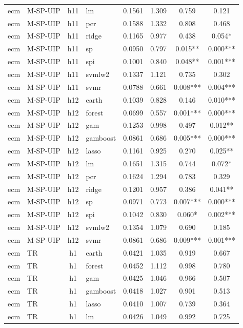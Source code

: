 \begin{ThreePartTable}
\begin{longtable}[t]{llclcccc}
ecm & M-SP-UIP & h11 & lm & 0.1561 & 1.309 & 0.759 & 0.121\\
ecm & M-SP-UIP & h11 & pcr & 0.1588 & 1.332 & 0.808 & 0.468\\
ecm & M-SP-UIP & h11 & ridge & 0.1165 & 0.977 & 0.438 & 0.054*\\
ecm & M-SP-UIP & h11 & sp & 0.0950 & 0.797 & 0.015** & 0.000***\\
ecm & M-SP-UIP & h11 & spi & 0.1001 & 0.840 & 0.048** & 0.001***\\
ecm & M-SP-UIP & h11 & svmlw2 & 0.1337 & 1.121 & 0.735 & 0.302\\
ecm & M-SP-UIP & h11 & svmr & 0.0788 & 0.661 & 0.008*** & 0.004***\\
\addlinespace
ecm & M-SP-UIP & h12 & earth & 0.1039 & 0.828 & 0.146 & 0.010***\\
ecm & M-SP-UIP & h12 & forest & 0.0699 & 0.557 & 0.001*** & 0.000***\\
ecm & M-SP-UIP & h12 & gam & 0.1253 & 0.998 & 0.497 & 0.012**\\
ecm & M-SP-UIP & h12 & gamboost & 0.0861 & 0.686 & 0.005*** & 0.000***\\
ecm & M-SP-UIP & h12 & lasso & 0.1161 & 0.925 & 0.270 & 0.025**\\
ecm & M-SP-UIP & h12 & lm & 0.1651 & 1.315 & 0.744 & 0.072*\\
ecm & M-SP-UIP & h12 & pcr & 0.1624 & 1.294 & 0.783 & 0.329\\
ecm & M-SP-UIP & h12 & ridge & 0.1201 & 0.957 & 0.386 & 0.041**\\
ecm & M-SP-UIP & h12 & sp & 0.0971 & 0.773 & 0.007*** & 0.000***\\
ecm & M-SP-UIP & h12 & spi & 0.1042 & 0.830 & 0.060* & 0.002***\\
ecm & M-SP-UIP & h12 & svmlw2 & 0.1354 & 1.079 & 0.690 & 0.185\\
ecm & M-SP-UIP & h12 & svmr & 0.0861 & 0.686 & 0.009*** & 0.001***\\
\addlinespace
ecm & TR & h1 & earth & 0.0421 & 1.035 & 0.919 & 0.667\\
ecm & TR & h1 & forest & 0.0452 & 1.112 & 0.998 & 0.780\\
ecm & TR & h1 & gam & 0.0425 & 1.046 & 0.966 & 0.507\\
ecm & TR & h1 & gamboost & 0.0418 & 1.027 & 0.901 & 0.513\\
ecm & TR & h1 & lasso & 0.0410 & 1.007 & 0.739 & 0.364\\
ecm & TR & h1 & lm & 0.0426 & 1.049 & 0.992 & 0.725\\

\end{longtable}
\end{ThreePartTable}
